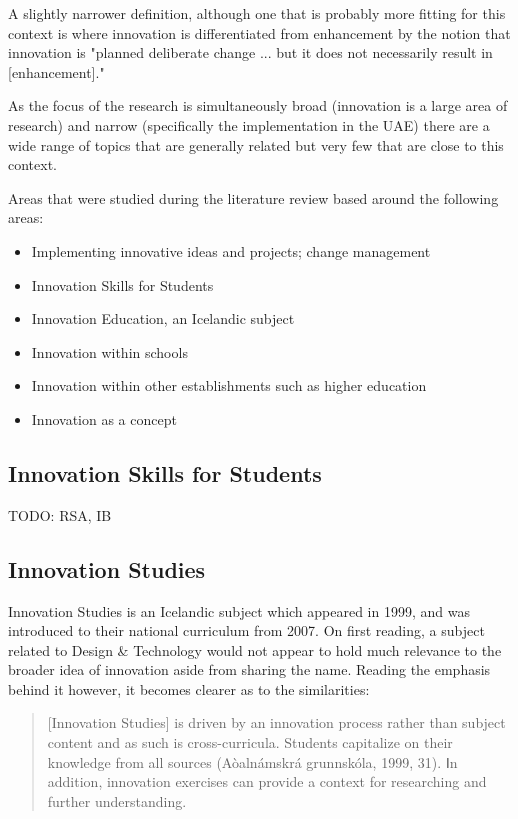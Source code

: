 A slightly narrower definition, although one that is probably more fitting for this context is where innovation is differentiated from enhancement by the notion that innovation is "planned deliberate change ... but it does not necessarily result in [enhancement]." \cite{hannan2002innovative}

As the focus of the research is simultaneously broad (innovation is a large area of research) and narrow (specifically the implementation in the UAE) there are a wide range of topics that are generally related but very few that are close to this context. 

Areas that were studied during the literature review based around the following areas:
\begin{itemize}
\item Implementing innovative ideas and projects; change management
\item Innovation Skills for Students
\item Innovation Education, an Icelandic subject
\item Innovation within schools
\item Innovation within other establishments such as higher education
\item Innovation as a concept
\end{itemize}

\subsection{Innovation Skills for Students}
TODO: RSA, IB

\subsection{Innovation Studies}
Innovation Studies is an Icelandic subject which appeared in 1999, and was introduced to their national curriculum from 2007. On first reading, a subject related to Design & Technology would not appear to hold much relevance to the broader idea of innovation aside from sharing the name. Reading the emphasis behind it however, it becomes clearer as to the similarities:
\begin{quote}
[Innovation Studies] is driven by an innovation process rather than subject content and as such is cross-curricula. Students capitalize on their
knowledge from all sources (Aòalnámskrá grunnskóla, 1999, 31). Ⅰn addition, innovation exercises can provide a context for researching and further understanding.
\end{quote} \cite{thorsteinsson2005innovation}

